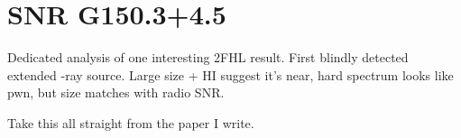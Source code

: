 \chapter{SNR G150.3+4.5}
\label{chap:G150}
Dedicated analysis  of one interesting 2FHL result. First blindly detected extended \g -ray source. Large size  + HI suggest it's near, hard spectrum looks like pwn, but size matches with radio SNR.

Take this all straight from the paper I write.